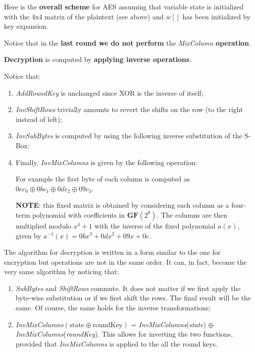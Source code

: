 Here is the \textbf{overall scheme} for AES assuming that variable state is initialized with the 4x4 matrix of the plaintext (see above) and $w[]$ has been initialized by key expansion.


Notice that in the \textbf{last round we do not perform} the \textit{MixColumn} \textbf{operation}.

\textbf{Decryption} is computed by \textbf{applying inverse operations}.


Notice that:

\begin{enumerate}
    \item \textit{AddRoundKey} is unchanged since XOR is the inverse of itself;
    \item \textit{InvShiftRows} trivially amounts to revert the shifts on the row (to the right instead of left);
    \item \textit{InvSubBytes} is computed by using the following inverse substitution of the S-Box:


    \item Finally, \textit{InvMixColumns} is given by the following operation:


    For example the first byte of each column is computed as $0e c_0 \oplus 0b c_1 \oplus 0d c_2 \oplus 09 c_3$.

    \textbf{NOTE}: this fixed matrix is obtained by considering each column as a four-term polynomial with coefficients in $\mathbf{GF}(2^8)$. The columns are then multiplied modulo $x^4 + 1$ with the inverse of the fixed polynomial $a(x)$, given by $a^{-1}(x) = 0b x^3 + 0d x^2 + 09 x + 0e$.
    
\end{enumerate}

The algorithm for decryption is written in a form similar to the one for encryption but operations are not in the same order. It can, in fact, become the very same algorithm by noticing that:

\begin{enumerate}
    \item \textit{SubBytes} and \textit{ShiftRows} commute. It does not matter if we first apply the byte-wise substitution or if we first shift the rows. The final result will be the same. Of course, the same holds for the inverse transformations;

    \item \textit{InvMixColumns}$(\text{state} \oplus \text{roundKey})$ = \textit{InvMixColumns}(\textit{state}) $\oplus$ \textit{InvMixColumns}(\textit{roundKey}). This allows for inverting the two functions, provided that \textit{InvMixColumns} is applied to the all the round keys.

\end{enumerate}

